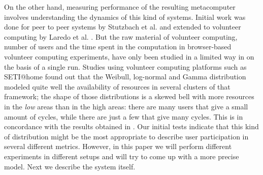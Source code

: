 \documentclass[journal,onecolumn]{IEEEtran}
\begin{document}




 
On the other hand, measuring performance of the resulting metacomputer
involves understanding the dynamics of this kind of systems. Initial
work was done for peer to peer systems by Stutzbach et
al. \cite{stutzbach2006understanding} and extended to volunteer
computing by Laredo et al. \cite{churn08,laredo2008rcp}. But the raw material of
volunteer computing, number of users and the time spent in the
computation in browser-based volunteer computing experiments, have only been studied in a limited way in
\cite{DBLP:journals/gpem/LaredoBGVAGF14} on the basis of a single
run. Studies using volunteer computing platforms such as SETI@home
\cite{javadi2009mining} found out that the Weibull, log-normal and Gamma distribution
modeled quite well the availability of resources in several clusters
of that framework; the shape of those distributions is a skewed bell
with more resources in the {\em low} areas than in the high areas:
there are many users that give a small amount of cycles, while there
are just a few that give many cycles. This is in concordance with the
results obtained in \cite{agajaj}. Our initial tests indicate that
this kind of distribution might be the most appropriate to describe
user participation in several different metrics. However, in this
paper we will perform different experiments in different setups and
will try to come up with a more precise model. Next we describe the
system itself. 
\end{document}
